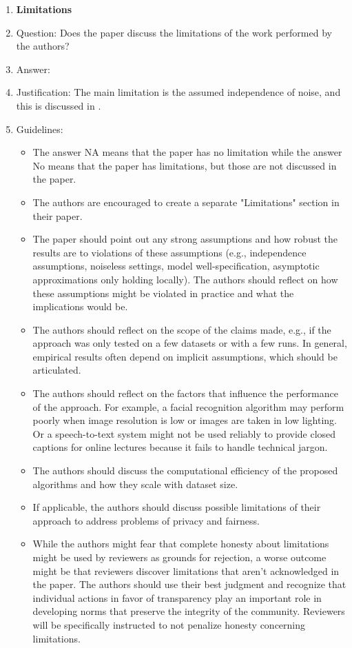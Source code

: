 \documentclass{article}
\begin{document}
{\begin{enumerate}
\item {\bf Limitations}
    \item[] Question: Does the paper discuss the limitations of the work performed by the authors?
    \item[] Answer: \answerYes{} %
    \item[] Justification: The main limitation is the assumed independence of noise, and this is discussed  in .
    \item[] Guidelines:
    \begin{itemize}
        \item The answer NA means that the paper has no limitation while the answer No means that the paper has limitations, but those are not discussed in the paper. 
        \item The authors are encouraged to create a separate "Limitations" section in their paper.
        \item The paper should point out any strong assumptions and how robust the results are to violations of these assumptions (e.g., independence assumptions, noiseless settings, model well-specification, asymptotic approximations only holding locally). The authors should reflect on how these assumptions might be violated in practice and what the implications would be.
        \item The authors should reflect on the scope of the claims made, e.g., if the approach was only tested on a few datasets or with a few runs. In general, empirical results often depend on implicit assumptions, which should be articulated.
        \item The authors should reflect on the factors that influence the performance of the approach. For example, a facial recognition algorithm may perform poorly when image resolution is low or images are taken in low lighting. Or a speech-to-text system might not be used reliably to provide closed captions for online lectures because it fails to handle technical jargon.
        \item The authors should discuss the computational efficiency of the proposed algorithms and how they scale with dataset size.
        \item If applicable, the authors should discuss possible limitations of their approach to address problems of privacy and fairness.
        \item While the authors might fear that complete honesty about limitations might be used by reviewers as grounds for rejection, a worse outcome might be that reviewers discover limitations that aren't acknowledged in the paper. The authors should use their best judgment and recognize that individual actions in favor of transparency play an important role in developing norms that preserve the integrity of the community. Reviewers will be specifically instructed to not penalize honesty concerning limitations.
    \end{itemize}


\end{enumerate}}
\end{document}
